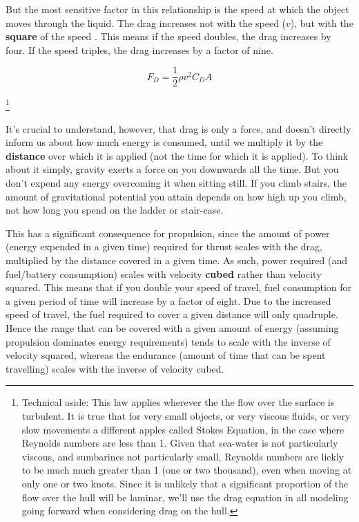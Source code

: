 \documentclass{article}\usepackage[]{graphicx}\usepackage[]{color}
\begin{document}
But the most sensitive factor in this relationship is the speed at which the object moves through the liquid.  The drag increases not with the speed ($v$), but with the \textbf{square} of the speed . This means if the speed doubles, the drag increases by four.  If the speed triples, the drag increases by a factor of nine.

\begin{equation}
\label{eq:1}
F_D = \frac{1}{2}\rho v^2C_DA
\end{equation}

\footnote{Technical aside: This law applies wherever the the flow over the surface is turbulent. It is true that for very small objects, or very viscous fluids, or very slow movements a different apples called Stokes Equation, in the case where Reynolds numbers are less than 1.  Given that sea-water is not particularly viscous, and sumbarines not particularly small, Reynolds numbers are liekly to be much much greater than 1 (one or two thousand), even when moving at only one or two knots.  Since it is unlikely that a significant proportion of the flow over the hull will be laminar, we'll use the drag equation in all modeling going forward when considering drag on the hull.}

It's crucial to understand, however, that drag is only a force, and doesn't directly inform us about how much energy is consumed, until we multiply it by the \textbf{distance} over which it is applied (not the time for which it is applied).  To think about it simply, gravity exerts a force on you downwards all the time.  But you don't expend any energy overcoming it when sitting still.  If you climb stairs, the amount of gravitational potential you attain depends on how high up you climb, not how long you spend on the ladder or stair-case.

This has a significant consequence for propulsion, since the amount of power (energy expended in a given time) required for thrust scales with the drag, multiplied by the distance covered in a given time.  As such, power required (and fuel/battery consumption) scales with velocity \textbf{cubed} rather than velocity squared.  This means that if you double your speed of travel, fuel consumption for a given period of time will increase by a factor of eight.  Due to the increased speed of travel, the fuel required to cover a given distance will only quadruple.  Hence the range that can be covered with a given amount of energy (assuming propulsion dominates energy requirements) tends to scale with the inverse of velocity squared, whereas the endurance (amount of time that can be spent travelling) scales with the inverse of velocity cubed.
\end{document}
